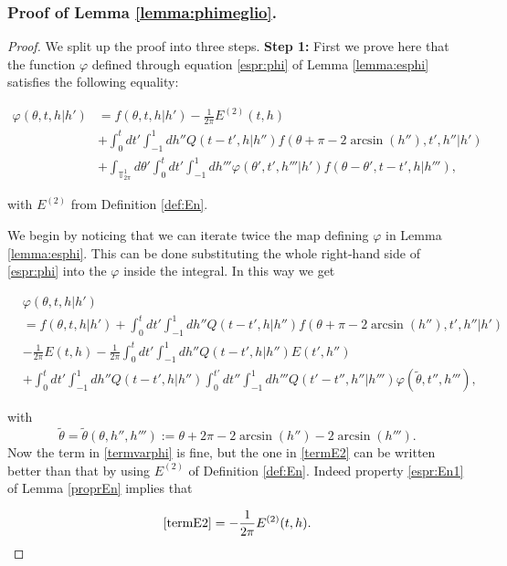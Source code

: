 \documentclass[a4paper,10pt,reqno]{amsart}
\numberwithin{equation}{subsection}
\numberwithin{figure}{subsection}
\begin{document}
\subsubsection{Proof of Lemma \ref{lemma:phimeglio}.}
\begin{proof} We split up the proof into three steps.
\newline
\textbf{Step 1:} First we prove here that the function $\varphi$ defined through equation \eqref{espr:phi} of Lemma \ref{lemma:esphi} satisfies the following equality:

\begin{align}
\nonumber\varphi(\theta,t,h|h')&=f(\theta,t,h|h')-\frac{1}{2\pi}E^{(2)}(t,h)
\\
\nonumber&+\int_0^tdt'\int_{-1}^1dh''Q(t-t',h|h'')f(\theta+\pi-2\arcsin(h''),t',h''|h')
\\
\label{passo1}&+\int_{\mathbb{T}^1_{2\pi}}d\theta'\int_0^tdt'\int_{-1}^1dh'''\varphi(\theta',t',h'''|h')f(\theta-\theta',t-t',h|h'''),
\end{align}

with $E^{(2)}$ from Definition \ref{def:En}.

We begin by noticing that we can iterate twice the map defining  $\varphi$ in Lemma \ref{lemma:esphi}. This can be done substituting the whole right-hand side of \eqref{espr:phi} into the $\varphi$ inside the integral. In this way we get

{\small\begin{align}
\label{termvarphi}&\varphi(\theta,t,h|h')
\\
\label{termok}&=f(\theta,t,h|h')+\int_0^tdt'\int_{-1}^1dh''Q(t-t',h|h'')f(\theta+\pi-2\arcsin(h''),t',h''|h')
\\
\label{termE2}&-\frac{1}{2\pi}E(t,h)-\frac{1}{2\pi}\int_0^tdt'\int_{-1}^1dh''Q(t-t',h|h'')E(t',h'')
\\
\label{termphi}&+\int_0^tdt'\int_{-1}^1dh''Q(t-t',h|h'')\int_0^{t'}dt''\int_{-1}^1dh'''Q(t'-t'',h''|h''')\varphi(\tilde\theta,t'',h'''),
\end{align}}

with
\[
\tilde\theta=\tilde\theta(\theta,h'',h'''):=\theta+2\pi-2\arcsin(h'')-2\arcsin(h''').
\]
Now the term in \eqref{termvarphi} is fine, but the one in \eqref{termE2} can be written better than that by using $E^{(2)}$ of Definition \ref{def:En}. Indeed property \eqref{espr:En1} of Lemma \ref{proprEn} implies that

\begin{align*}
\eqref{termE2}=-\frac{1}{2\pi}E^{(2)}(t,h).
\end{align*}


\end{proof}
\end{document}
